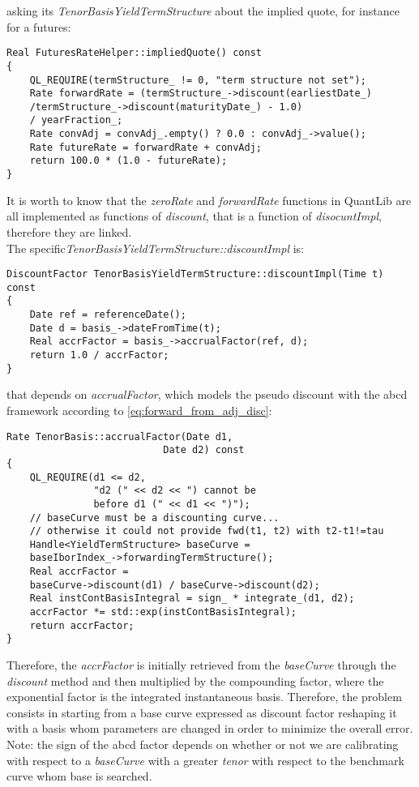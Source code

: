 asking its \textit{TenorBasisYieldTermStructure} about the implied quote, for instance for a futures:

\begin{lstlisting}
Real FuturesRateHelper::impliedQuote() const 
{
    QL_REQUIRE(termStructure_ != 0, "term structure not set");
    Rate forwardRate = (termStructure_->discount(earliestDate_)
    /termStructure_->discount(maturityDate_) - 1.0) 
    / yearFraction_;
    Rate convAdj = convAdj_.empty() ? 0.0 : convAdj_->value();
    Rate futureRate = forwardRate + convAdj;
    return 100.0 * (1.0 - futureRate);
}
\end{lstlisting}

It is worth to know that the \textit{zeroRate} and \textit{forwardRate} functions in QuantLib are all implemented as functions of \textit{discount}, that is a function of \textit{disocuntImpl}, therefore they are linked.\\
The specific\textit{TenorBasisYieldTermStructure::discountImpl} is:

\begin{lstlisting}
DiscountFactor TenorBasisYieldTermStructure::discountImpl(Time t) const
{
    Date ref = referenceDate();
    Date d = basis_->dateFromTime(t);
    Real accrFactor = basis_->accrualFactor(ref, d);
    return 1.0 / accrFactor;
}
\end{lstlisting}

that depends on \textit{accrualFactor}, which models the pseudo discount with the abcd framework according to \eqref{eq:forward_from_adj_disc}:

\begin{lstlisting}
Rate TenorBasis::accrualFactor(Date d1,
                           Date d2) const
{
    QL_REQUIRE(d1 <= d2,
               "d2 (" << d2 << ") cannot be
               before d1 (" << d1 << ")");
    // baseCurve must be a discounting curve...
    // otherwise it could not provide fwd(t1, t2) with t2-t1!=tau
    Handle<YieldTermStructure> baseCurve =
    baseIborIndex_->forwardingTermStructure();
    Real accrFactor =
    baseCurve->discount(d1) / baseCurve->discount(d2);
    Real instContBasisIntegral = sign_ * integrate_(d1, d2);
    accrFactor *= std::exp(instContBasisIntegral);
    return accrFactor;
}
\end{lstlisting}

Therefore, the \textit{accrFactor} is initially retrieved from the \textit{baseCurve} through the \textit{discount} method and then multiplied by the compounding factor, where the exponential factor is the integrated instantaneous basis. Therefore, the problem consists in starting from a base curve expressed as discount factor reshaping it with a basis whom parameters are changed in order to minimize the overall error. Note: the sign of the abcd factor depends on whether or not we are calibrating with respect to a \textit{baseCurve} with a greater \textit{tenor} with respect to the benchmark curve whom base is searched.

